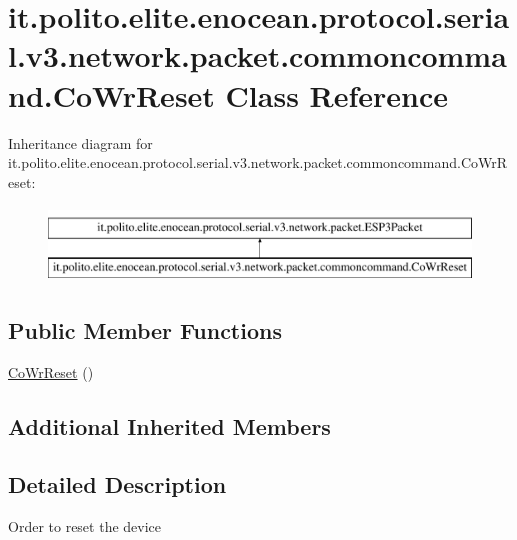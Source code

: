\hypertarget{classit_1_1polito_1_1elite_1_1enocean_1_1protocol_1_1serial_1_1v3_1_1network_1_1packet_1_1commoncommand_1_1_co_wr_reset}{}\section{it.\+polito.\+elite.\+enocean.\+protocol.\+serial.\+v3.\+network.\+packet.\+commoncommand.\+Co\+Wr\+Reset Class Reference}
\label{classit_1_1polito_1_1elite_1_1enocean_1_1protocol_1_1serial_1_1v3_1_1network_1_1packet_1_1commoncommand_1_1_co_wr_reset}
Inheritance diagram for it.\+polito.\+elite.\+enocean.\+protocol.\+serial.\+v3.\+network.\+packet.\+commoncommand.\+Co\+Wr\+Reset\+:\begin{figure}[H]
\begin{center}
\leavevmode
\includegraphics[height=2.000000cm]{classit_1_1polito_1_1elite_1_1enocean_1_1protocol_1_1serial_1_1v3_1_1network_1_1packet_1_1commoncommand_1_1_co_wr_reset}
\end{center}
\end{figure}
\subsection*{Public Member Functions}
\begin{DoxyCompactItemize}
\item 
\hyperlink{classit_1_1polito_1_1elite_1_1enocean_1_1protocol_1_1serial_1_1v3_1_1network_1_1packet_1_1commoncommand_1_1_co_wr_reset_ac4dff7923df2640a5ea6d40e88bc3883}{Co\+Wr\+Reset} ()
\end{DoxyCompactItemize}
\subsection*{Additional Inherited Members}


\subsection{Detailed Description}
Order to reset the device

